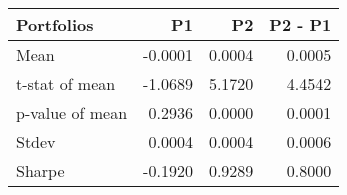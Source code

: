 \begin{tabular}{lrrr}
\toprule
Portfolios & P1 & P2 & P2 - P1 \\
\midrule
Mean & -0.0001 & 0.0004 & 0.0005 \\
t-stat of mean & -1.0689 & 5.1720 & 4.4542 \\
p-value of mean & 0.2936 & 0.0000 & 0.0001 \\
Stdev & 0.0004 & 0.0004 & 0.0006 \\
Sharpe & -0.1920 & 0.9289 & 0.8000 \\
\bottomrule
\end{tabular}
